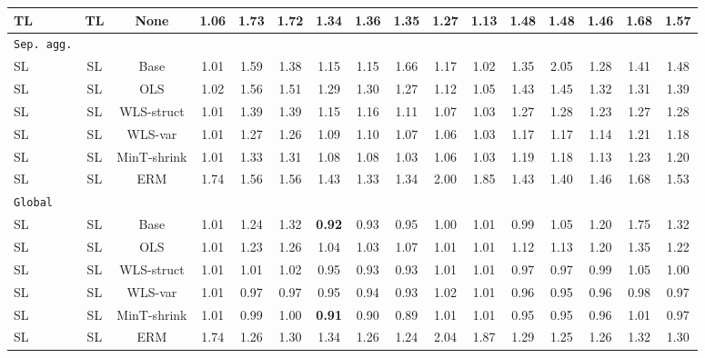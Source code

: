\documentclass[preprint, 3p, times, twocolumn]{elsarticle}
\begin{document}
\begin{sidewaystable*}[t]
\begin{center}
{\begin{tabular}{l c  cccccccccccccc}
    \hspace{0.1cm} 	TL	&TL	&None	&1.06	&1.73	&1.72	&1.34	&1.36	&1.35	&1.27	&1.13	&1.48	&1.48	&1.46	&1.68	&1.57	\\
    \midrule																	
    \texttt{Sep. agg.}																\\
    \hspace{0.1cm} 	SL	&SL	&Base	&1.01	&1.59	&1.38	&1.15	&1.15	&1.66	&1.17	&1.02	&1.35	&2.05	&1.28	&1.41	&1.48	\\
    \hspace{0.1cm} 	SL	&SL	&OLS	&1.02	&1.56	&1.51	&1.29	&1.30	&1.27	&1.12	&1.05	&1.43	&1.45	&1.32	&1.31	&1.39	\\
    \hspace{0.1cm} 	SL	&SL	&WLS-struct	&1.01	&1.39	&1.39	&1.15	&1.16	&1.11	&1.07	&1.03	&1.27	&1.28	&1.23	&1.27	&1.28	\\
    \hspace{0.1cm} 	SL	&SL	&WLS-var	&1.01	&1.27	&1.26	&1.09	&1.10	&1.07	&1.06	&1.03	&1.17	&1.17	&1.14	&1.21	&1.18	\\
    \hspace{0.1cm} 	SL	&SL	&MinT-shrink	&1.01	&1.33	&1.31	&1.08	&1.08	&1.03	&1.06	&1.03	&1.19	&1.18	&1.13	&1.23	&1.20	\\
    \hspace{0.1cm} 	SL	&SL	&ERM	&1.74	&1.56	&1.56	&1.43	&1.33	&1.34	&2.00	&1.85	&1.43	&1.40	&1.46	&1.68	&1.53	\\
    \midrule																	
    \texttt{Global}																	\\
    \hspace{0.1cm} 	SL	&SL	&Base	&1.01	&1.24	&1.32	&\textbf{0.92}	&0.93	&0.95	&1.00	&1.01	&0.99	&1.05	&1.20	&1.75	&1.32	\\
    \hspace{0.1cm} 	SL	&SL	&OLS	&1.01	&1.23	&1.26	&1.04	&1.03	&1.07	&1.01	&1.01	&1.12	&1.13	&1.20	&1.35	&1.22	\\
    \hspace{0.1cm} 	SL	&SL	&WLS-struct	&1.01	&1.01	&1.02	&0.95	&0.93	&0.93	&1.01	&1.01	&0.97	&0.97	&0.99	&1.05	&1.00	\\
    \hspace{0.1cm} 	SL	&SL	&WLS-var	&1.01	&0.97	&0.97	&0.95	&0.94	&0.93	&1.02	&1.01	&0.96	&0.95	&0.96	&0.98	&0.97	\\
    \hspace{0.1cm} 	SL	&SL	&MinT-shrink	&1.01	&0.99	&1.00	&\textbf{0.91}	&0.90	&0.89	&1.01	&1.01	&0.95	&0.95	&0.96	&1.01	&0.97	\\
    \hspace{0.1cm} 	SL	&SL	&ERM	&1.74	&1.26	&1.30	&1.34	&1.26	&1.24	&2.04	&1.87	&1.29	&1.25	&1.26	&1.32	&1.30	\\
    
    
    \bottomrule
    \end{tabular}}
    \end{center}
    \end{sidewaystable*}
\end{document}
